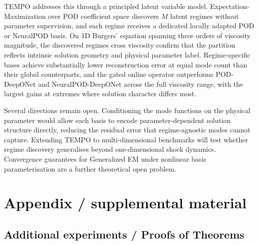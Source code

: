 \documentclass{article}
\begin{document}
TEMPO addresses this through a principled latent variable model.
Expectation-Maximization over POD coefficient space discovers $M$ latent regimes without parameter supervision, and each regime receives a dedicated locally adapted POD or NeuralPOD basis.
On 1D Burgers' equation spanning three orders of viscosity magnitude, the discovered regimes cross viscosity confirm that the partition reflects intrinsic solution geometry and  physical parameter label.
Regime-specific bases achieve substantially lower reconstruction error at equal mode count than their global counterparts, and the gated online operator outperforms POD-DeepONet and NeuralPOD-DeepONet across the full viscosity range, with the largest gains at extremes where solution character differs most.

Several directions remain open.
Conditioning the mode functions on the physical parameter would allow each basis to encode parameter-dependent solution structure directly, reducing the residual error that regime-agnostic modes cannot capture.
Extending TEMPO to multi-dimensional benchmarks will test whether regime discovery generalises beyond one-dimensional shock dynamics.
Convergence guarantees for Generalized EM under nonlinear basis parameterisation are a further theoretical open problem.

\newpage
\clearpage






\newpage
\appendix
\section{Appendix / supplemental material}\label{app}

\subsection{Additional experiments / Proofs of Theorems}\label{app:exp}
\end{document}
